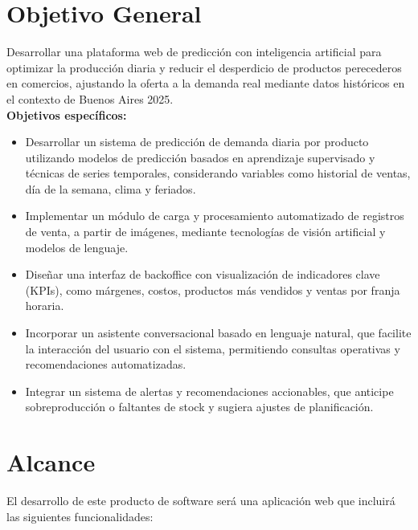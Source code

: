 \section{Objetivo General}

Desarrollar una plataforma web de predicción con inteligencia artificial para optimizar la producción diaria y reducir el desperdicio de productos perecederos en comercios, ajustando la oferta a la demanda real mediante datos históricos en el contexto de Buenos Aires 2025.\\

\noindent\textbf{Objetivos específicos:}

\begin{itemize}
    \item Desarrollar un sistema de predicción de demanda diaria por producto utilizando modelos de predicción basados en aprendizaje supervisado y técnicas de series temporales, considerando variables como historial de ventas, día de la semana, clima y feriados.
    
    \item Implementar un módulo de carga y procesamiento automatizado de registros de venta, a partir de imágenes, mediante tecnologías de visión artificial y modelos de lenguaje.
    
    \item Diseñar una interfaz de backoffice con visualización de indicadores clave (KPIs), como márgenes, costos, productos más vendidos y ventas por franja horaria.
    
    \item Incorporar un asistente conversacional basado en lenguaje natural, que facilite la interacción del usuario con el sistema, permitiendo consultas operativas y recomendaciones automatizadas.
    
    \item Integrar un sistema de alertas y recomendaciones accionables, que anticipe sobreproducción o faltantes de stock y sugiera ajustes de planificación.
    
\end{itemize}

\section{Alcance}

El desarrollo de este producto de software será una aplicación web que incluirá las siguientes funcionalidades:

